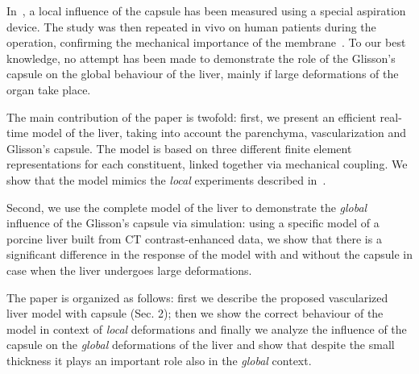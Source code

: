\documentclass{llncs}
\begin{document}
In~\cite{Hollenstein2006}, a local influence of the capsule has been measured using a special aspiration device. The study was then repeated 
in vivo on human patients during the operation, confirming the mechanical importance of the membrane~\cite{Ahn2010,Nava2008}.
To our best knowledge, no attempt has been made to demonstrate the role of the Glisson's capsule on the global behaviour of 
the liver, mainly if large deformations of the organ take place.

The main contribution of the paper is twofold: first, we present an efficient real-time model of the liver, taking into account 
the parenchyma, vascularization and Glisson's capsule. The model is based on three different finite element representations for each constituent,
linked together via mechanical coupling. We show that the model mimics the \emph{local} experiments described in~\cite{Hollenstein2006}.
 
Second, we use the complete model of the liver to demonstrate the \emph{global} influence of the Glisson's
capsule via simulation: using a specific model of a porcine liver built from CT contrast-enhanced data, we show that there is a significant 
difference in the response of the model with and without the capsule in case when the liver undergoes large deformations. 

The paper is organized as follows: first we describe the proposed vascularized
liver model with capsule (Sec. 2); then we show the correct behaviour of the
model in context of \emph{local} deformations and finally we analyze the influence of
the capsule on the \emph{global} deformations of the liver and show that despite the
small thickness it plays an important role also in the \emph{global} context.
\end{document}
